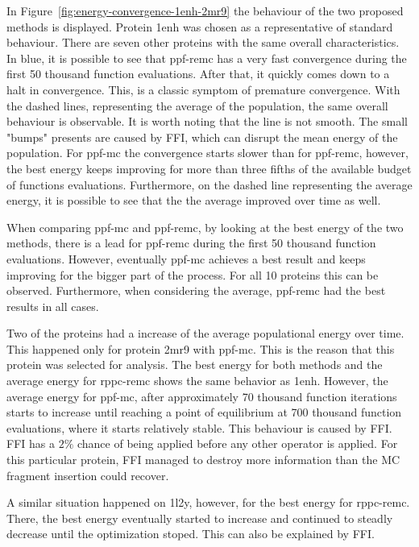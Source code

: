 In Figure~\ref{fig:energy-convergence-1enh-2mr9} the behaviour of the two
proposed methods is displayed. Protein 1enh was chosen as a representative
of standard behaviour. There are seven other proteins with the same overall
characteristics. In blue, it is possible to see that ppf-remc has a very fast
convergence during the first 50 thousand function evaluations. After that, it
quickly comes down to a halt in convergence. This, is a classic symptom of
premature convergence. With the dashed lines, representing the average of the
population, the same overall behaviour is observable. It is worth noting that
the line is not smooth. The small "bumps" presents are caused by FFI, which
can disrupt the mean energy of the population. For ppf-mc the convergence
starts slower than for ppf-remc, however, the best energy keeps improving
for more than three fifths of the available budget of functions evaluations.
Furthermore, on the dashed line representing the average energy, it is possible
to see that the the average improved over time as well.

When comparing ppf-mc and ppf-remc, by looking at the best energy of the two
methods, there is a lead for ppf-remc during the first 50 thousand function
evaluations. However, eventually ppf-mc achieves a best result and keeps
improving for the bigger part of the process. For all 10 proteins this can be
observed. Furthermore, when considering the average, ppf-remc had the best
results in all cases.

Two of the proteins had a increase of the average populational energy over time.
This happened only for protein 2mr9 with ppf-mc. This is the reason that this
protein was selected for analysis. The best energy for both methods and the
average energy for rppc-remc shows the same behavior as 1enh. However, the
average energy for ppf-mc, after approximately 70 thousand function iterations
starts to increase until reaching a point of equilibrium at 700 thousand
function evaluations, where it starts relatively stable. This behaviour is
caused by FFI. FFI has a $2\%$ chance of being applied before any other operator
is applied. For this particular protein, FFI managed to destroy more information
than the MC fragment insertion could recover.

A similar situation happened on 1l2y, however, for the best energy for
rppc-remc. There, the best energy eventually started to increase and continued
to steadly decrease until the optimization stoped. This can also be explained
by FFI.

